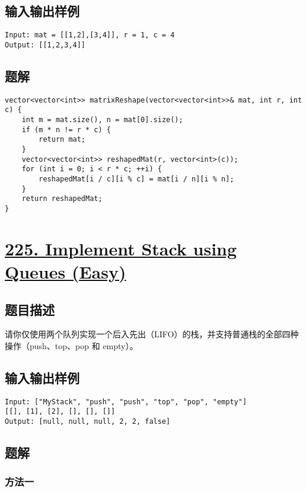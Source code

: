 \documentclass[lang=cn,10pt]{elegantbook}
\begin{document}
\subsection*{输入输出样例}

\begin{lstlisting}
Input: mat = [[1,2],[3,4]], r = 1, c = 4
Output: [[1,2,3,4]]
\end{lstlisting}

\subsection*{题解}

\begin{lstlisting}
vector<vector<int>> matrixReshape(vector<vector<int>>& mat, int r, int c) {
	int m = mat.size(), n = mat[0].size();
	if (m * n != r * c) {
		return mat;
	}
	vector<vector<int>> reshapedMat(r, vector<int>(c));
	for (int i = 0; i < r * c; ++i) {
		reshapedMat[i / c][i % c] = mat[i / n][i % n];
	}
	return reshapedMat;
}
\end{lstlisting}

{\color{red}\section{\href{https://leetcode.cn/problems/implement-stack-using-queues/}{225. Implement Stack using Queues (Easy)}}} \label{ch11.225}

\subsection*{题目描述}

请你仅使用两个队列实现一个后入先出（LIFO）的栈，并支持普通栈的全部四种操作（push、top、pop 和 empty）。

\subsection*{输入输出样例}

\begin{lstlisting}
Input: ["MyStack", "push", "push", "top", "pop", "empty"]
[[], [1], [2], [], [], []]
Output: [null, null, null, 2, 2, false]
\end{lstlisting}

\subsection*{题解}

\subsubsection*{方法一}
\end{document}
